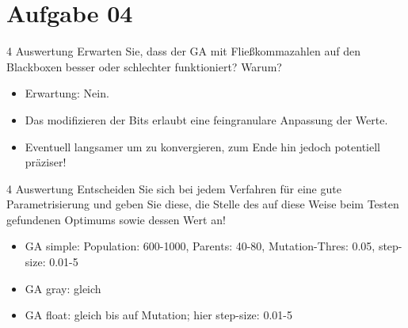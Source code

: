 \documentclass{ocbeameruni}
\begin{document}
\section{Aufgabe 04}

\begin{frame}{4 Auswertung}
Erwarten Sie, dass der GA mit Fließkommazahlen auf den Blackboxen besser oder schlechter
funktioniert? Warum?
    \begin{itemize}
    \item Erwartung: Nein.
    \item Das modifizieren der Bits erlaubt eine feingranulare Anpassung der Werte.
    \item Eventuell langsamer um zu konvergieren, zum Ende hin jedoch potentiell präziser!
    \end{itemize}
\end{frame}

\begin{frame}{4 Auswertung}
Entscheiden Sie sich bei jedem Verfahren für eine gute Parametrisierung und geben Sie diese,
die Stelle des auf diese Weise beim Testen gefundenen Optimums sowie dessen Wert an!
    \begin{itemize}
    \item GA simple: Population: 600-1000, Parents: 40-80, Mutation-Thres: 0.05, step-size: 0.01-5
    \item GA gray: gleich
    \item GA float: gleich bis auf Mutation; hier step-size: 0.01-5
    \end{itemize}
\end{frame}
\end{document}
